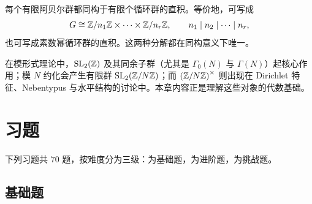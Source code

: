 \begin{theorem}[有限阿贝尔群结构定理，陈述]
每个有限阿贝尔群都同构于有限个循环群的直积。等价地，可写成
\[
 G \cong \mathbb{Z}/n_1\mathbb{Z} \times \cdots \times \mathbb{Z}/n_r\mathbb{Z}, \qquad n_1\mid n_2\mid \cdots \mid n_r,
\]
也可写成素数幂循环群的直积。这两种分解都在同构意义下唯一。
\end{theorem}

\begin{remark}[与模形式的联系]
在模形式理论中，$\mathrm{SL}_2(\mathbb{Z})$ 及其同余子群（尤其是 $\Gamma_0(N)$ 与 $\Gamma(N)$）起核心作用；模 $N$ 约化会产生有限群 $\mathrm{SL}_2(\mathbb{Z}/N\mathbb{Z})$；而 $\left(\mathbb{Z}/N\mathbb{Z}\right)^\times$ 则出现在 Dirichlet 特征、Nebentypus 与水平结构的讨论中。本章内容正是理解这些对象的代数基础。
\end{remark}

\section*{习题}

下列习题共 $70$ 题，按难度分为三级：\basic 为基础题，\medium 为进阶题，\hard 为挑战题。

\subsection*{基础题}

